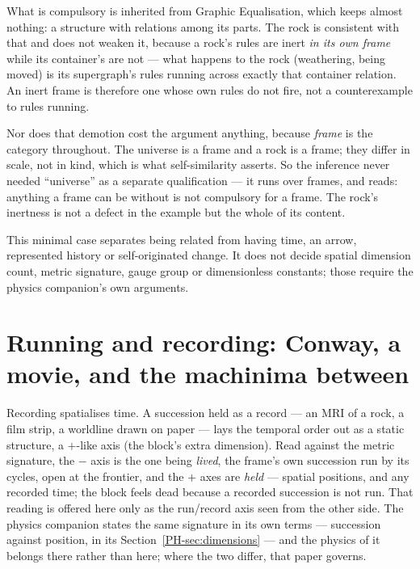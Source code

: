 \documentclass[11pt,a4paper]{article}
\theoremstyle{remark}\newtheorem{remark}[definition]{Remark}
\begin{document}
What is compulsory is inherited from Graphic Equalisation, which keeps almost nothing: a
structure with relations among its parts. The rock is consistent with that and does not
weaken it, because a rock's rules are inert \emph{in its own frame} while its container's are
not --- what happens to the rock (weathering, being moved) is its supergraph's rules running
across exactly that container relation. An inert frame is therefore one whose own rules
do not fire, not a counterexample to rules running.

Nor does that demotion cost the argument anything, because \emph{frame} is the category throughout.
The universe is a frame and a rock is a frame; they differ in scale, not in kind, which is what
self-similarity asserts. So the inference never needed ``universe'' as a separate qualification --- it
runs over frames, and reads: anything a frame can be without is not compulsory for a frame. The
rock's inertness is not a defect in the example but the whole of its content.

This minimal case separates being related from having time, an arrow,
represented history or self-originated change. It does not decide spatial
dimension count, metric signature, gauge group or dimensionless constants;
those require the physics companion's own arguments.

\section{Running and recording: Conway, a movie, and the machinima between}\label{sec:runrecord}
Recording spatialises time. A succession held as a record --- an MRI of a rock, a
film strip, a worldline drawn on paper --- lays the temporal order out as a static
structure, a $+$-like axis (the block's extra dimension). Read against the metric
signature, the $-$ axis is the one being \emph{lived}, the frame's own succession
run by its cycles, open at the frontier, and the $+$ axes are \emph{held} --- spatial
positions, and any recorded time; the block feels dead because a recorded succession
is not run. That reading is offered here only as the run/record axis seen from the
other side. The physics companion states the same signature in its own terms ---
succession against position, in its Section~\ref{PH-sec:dimensions} --- and the
physics of it belongs there rather than here; where the two differ, that paper
governs.
\end{document}
